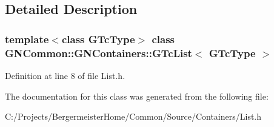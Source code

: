 \subsection{Detailed Description}
\subsubsection*{template$<$class G\+Tc\+Type$>$\newline
class G\+N\+Common\+::\+G\+N\+Containers\+::\+G\+Tc\+List$<$ G\+Tc\+Type $>$}



Definition at line 8 of file List.\+h.



The documentation for this class was generated from the following file\+:\begin{DoxyCompactItemize}
\item 
C\+:/\+Projects/\+Bergermeister\+Home/\+Common/\+Source/\+Containers/List.\+h\end{DoxyCompactItemize}
